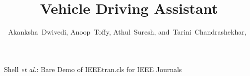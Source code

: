 \documentclass[journal]{IEEEtran}
\begin{document}
%
\title{Vehicle Driving Assistant}
%
%
%

\author{Akanksha~Dwivedi,
        Anoop~Toffy,
        Athul~Suresh,
        and~Tarini~Chandrashekhar,~}%


% 
%



%
{Shell \MakeLowercase{\textit{et al.}}: Bare Demo of IEEEtran.cls for IEEE Journals}
% 
\end{document}
